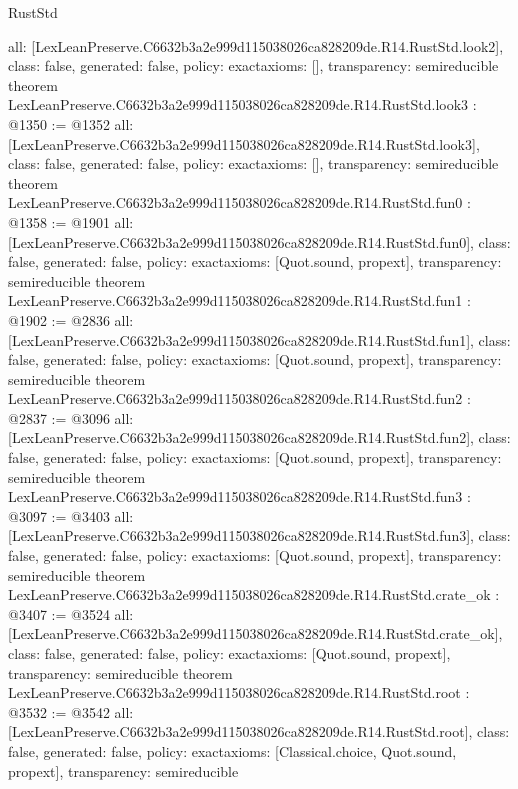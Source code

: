 \begin{lexlean}{RustStd}
\begin{coremodule}
{  all: [LexLeanPreserve.C6632b3a2e999d115038026ca828209de.R14.RustStd.look2],
  class: false,
  generated: false,
  policy: exact{axioms: []},
  transparency: semireducible
}
theorem LexLeanPreserve.C6632b3a2e999d115038026ca828209de.R14.RustStd.look3 : @1350 := @1352 {
  all: [LexLeanPreserve.C6632b3a2e999d115038026ca828209de.R14.RustStd.look3],
  class: false,
  generated: false,
  policy: exact{axioms: []},
  transparency: semireducible
}
theorem LexLeanPreserve.C6632b3a2e999d115038026ca828209de.R14.RustStd.fun0 : @1358 := @1901 {
  all: [LexLeanPreserve.C6632b3a2e999d115038026ca828209de.R14.RustStd.fun0],
  class: false,
  generated: false,
  policy: exact{axioms: [Quot.sound, propext]},
  transparency: semireducible
}
theorem LexLeanPreserve.C6632b3a2e999d115038026ca828209de.R14.RustStd.fun1 : @1902 := @2836 {
  all: [LexLeanPreserve.C6632b3a2e999d115038026ca828209de.R14.RustStd.fun1],
  class: false,
  generated: false,
  policy: exact{axioms: [Quot.sound, propext]},
  transparency: semireducible
}
theorem LexLeanPreserve.C6632b3a2e999d115038026ca828209de.R14.RustStd.fun2 : @2837 := @3096 {
  all: [LexLeanPreserve.C6632b3a2e999d115038026ca828209de.R14.RustStd.fun2],
  class: false,
  generated: false,
  policy: exact{axioms: [Quot.sound, propext]},
  transparency: semireducible
}
theorem LexLeanPreserve.C6632b3a2e999d115038026ca828209de.R14.RustStd.fun3 : @3097 := @3403 {
  all: [LexLeanPreserve.C6632b3a2e999d115038026ca828209de.R14.RustStd.fun3],
  class: false,
  generated: false,
  policy: exact{axioms: [Quot.sound, propext]},
  transparency: semireducible
}
theorem LexLeanPreserve.C6632b3a2e999d115038026ca828209de.R14.RustStd.crate_ok : @3407 := @3524 {
  all: [LexLeanPreserve.C6632b3a2e999d115038026ca828209de.R14.RustStd.crate_ok],
  class: false,
  generated: false,
  policy: exact{axioms: [Quot.sound, propext]},
  transparency: semireducible
}
theorem LexLeanPreserve.C6632b3a2e999d115038026ca828209de.R14.RustStd.root : @3532 := @3542 {
  all: [LexLeanPreserve.C6632b3a2e999d115038026ca828209de.R14.RustStd.root],
  class: false,
  generated: false,
  policy: exact{axioms: [Classical.choice, Quot.sound, propext]},
  transparency: semireducible
}


\end{coremodule}
\end{lexlean}
